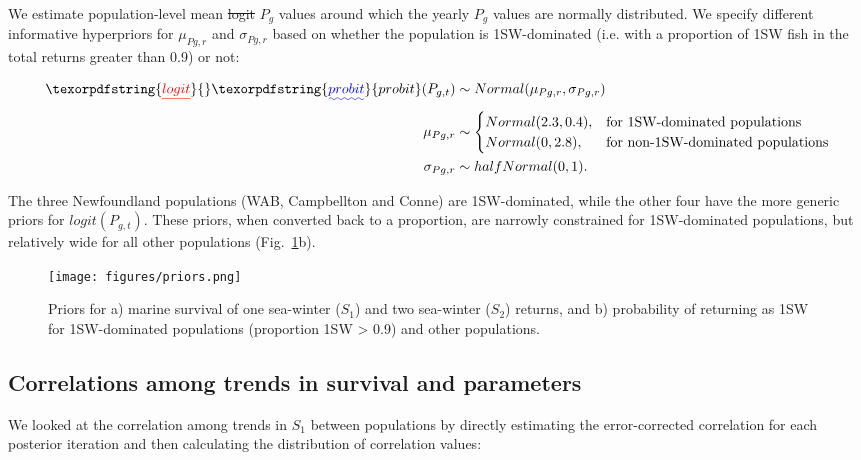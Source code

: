 \documentclass[12pt]{article}
\newcommand{\So}{$S_{1}$\xspace}
\newcommand{\St}{$S_{2}$\xspace}
\newcommand{\Pg}{$P_g$\xspace}
\newcommand{\prmu}{$\mu_{Pg,r}$\xspace}
\newcommand{\prsig}{$\sigma_{Pg,r}$\xspace}
\providecommand{\DIFaddtex}[1]{{\protect\color{blue}\uwave{#1}}} %
\providecommand{\DIFdeltex}[1]{{\protect\color{red}\sout{#1}}}                      %
\providecommand{\DIFaddbegin}{} %
\providecommand{\DIFaddend}{} %
\providecommand{\DIFdelbegin}{} %
\providecommand{\DIFdelend}{} %
\providecommand{\DIFadd}[1]{\texorpdfstring{\DIFaddtex{#1}}{#1}} %
\providecommand{\DIFdel}[1]{\texorpdfstring{\DIFdeltex{#1}}{}} %
\begin{document}
We estimate population-level mean \DIFdelbegin \DIFdel{logit }\DIFdelend \DIFaddbegin \DIFadd{probit }\DIFaddend \Pg values around which the yearly \Pg
values are normally distributed. We specify different informative hyperpriors
for \prmu and \prsig based on whether the population is 1SW-dominated (i.e.
with a proportion of 1SW fish in the total returns greater than 0.9) or not:

\begin{align}
    \DIFdelbegin \DIFdel{logit}\DIFdelend \DIFaddbegin \DIFadd{probit}\DIFaddend (P_{g,t}) &\sim Normal(\mu_{Pg,r}, \sigma_{Pg,r}) \\
    \mu_{Pg,r} &\sim
    \begin{cases}
       Normal(2.3, 0.4),  &\text{for 1SW-dominated populations} \\
       Normal(0, 2.8), &\text{for non-1SW-dominated populations} \\
   \end{cases} \\
    \sigma_{Pg,r} &\sim halfNormal(0, 1).
\end{align}

The three Newfoundland populations (WAB, Campbellton and Conne) are
1SW-dominated, while the other four have the more generic priors for \DIFdelbegin \DIFdel{$logit(P_{g,t})$}\DIFdelend \DIFaddbegin \DIFadd{$probit(P_{g,t})$}\DIFaddend .
These priors, when converted back to a proportion, are narrowly constrained
for 1SW-dominated populations, but relatively wide for all other populations
(Fig.~\ref{fig:priors}b).

\begin{figure}[htbp]
 \centering
    \texttt{[image: figures/priors.png]} \caption{Priors
        for a) marine survival of one sea-winter (\So) and two sea-winter
        (\St) returns, and b) probability of returning as 1SW for
        1SW-dominated populations (proportion 1SW > 0.9) and other populations.}
    \label{fig:priors}

\end{figure}
\subsection*{Correlations among trends in survival and parameters}

We looked at the correlation among trends in \So between populations by
directly estimating the error-corrected correlation for each posterior
iteration and then calculating the distribution of correlation values:
\end{document}

